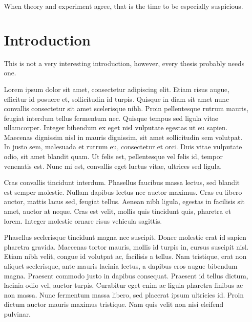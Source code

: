 \begin{savequote}[45mm]
When theory and experiment agree, 
that is the time to be especially suspicious. 
\end{savequote}

\chapter{Introduction}


This is not a very interesting introduction, however, every thesis probably
needs one.

Lorem ipsum dolor sit amet, consectetur adipiscing elit. Etiam risus augue, efficitur id posuere et, sollicitudin id turpis. Quisque in diam sit amet nunc convallis consectetur sit amet scelerisque nibh. Proin pellentesque rutrum mauris, feugiat interdum tellus fermentum nec. Quisque tempus sed ligula vitae ullamcorper. Integer bibendum ex eget nisl vulputate egestas ut eu sapien. Maecenas dignissim nisl in mauris dignissim, sit amet sollicitudin sem volutpat. In justo sem, malesuada et rutrum eu, consectetur et orci. Duis vitae vulputate odio, sit amet blandit quam. Ut felis est, pellentesque vel felis id, tempor venenatis est. Nunc mi est, convallis eget luctus vitae, ultrices sed ligula.

Cras convallis tincidunt interdum. Phasellus faucibus massa lectus, sed blandit est semper molestie. Nullam dapibus lectus nec auctor maximus. Cras eu libero auctor, mattis lacus sed, feugiat tellus. Aenean nibh ligula, egestas in facilisis sit amet, auctor at neque. Cras est velit, mollis quis tincidunt quis, pharetra et lorem. Integer molestie ornare risus vehicula sagittis.

Phasellus scelerisque tincidunt magna nec suscipit. Donec molestie erat id sapien pharetra gravida. Maecenas tortor mauris, mollis id turpis in, cursus suscipit nisl. Etiam nibh velit, congue id volutpat ac, facilisis a tellus. Nam tristique, erat non aliquet scelerisque, ante mauris lacinia lectus, a dapibus eros augue bibendum magna. Praesent commodo justo in dapibus consequat. Praesent id tellus dictum, lacinia odio vel, auctor turpis. Curabitur eget enim ac ligula pharetra finibus ac non massa. Nunc fermentum massa libero, sed placerat ipsum ultricies id. Proin dictum auctor mauris maximus tristique. Nam quis velit non nisi eleifend pulvinar.